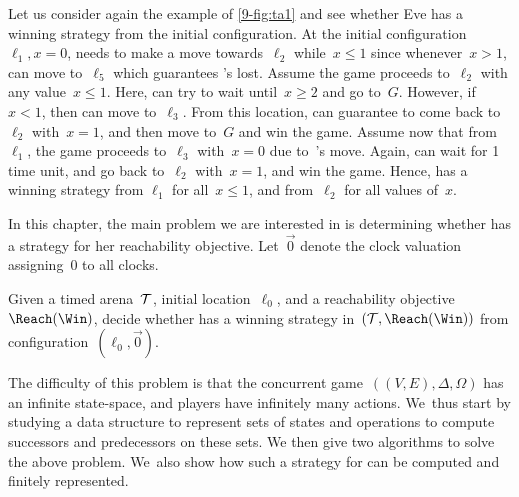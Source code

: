 \begin{example}
Let us consider again the example of \cref{9-fig:ta1} and see whether Eve
has a winning strategy from the initial configuration.
At the initial configuration~$\ell_1,x=0$, \Eve needs to make a move towards~$\ell_2$
while~$x\leq 1$ since whenever~$x>1$, \Adam can move to~$\ell_5$ which guarantees \Eve's lost.
Assume the game proceeds to~$\ell_2$ with any value~$x\leq 1$. Here, \Eve can try to wait
until~$x\geq 2$ and go to~$G$. However, if~$x<1$, then \Adam can move to~$\ell_3$.
From this location, \Eve can guarantee to come back to~$\ell_2$ with~$x=1$, and then move to~$G$ and win the game.
Assume now that from~$\ell_1$, the game proceeds to~$\ell_3$ with~$x=0$ due to~\Adam's move.
Again, \Eve can wait for 1 time unit, and go back to~$\ell_2$ with~$x=1$, and win the game.
%
Hence, \Eve has a winning strategy from $\ell_1$ for all~$x\leq 1$, and from~$\ell_2$
for all values of~$x$.
\end{example}


In this chapter, the main problem we are interested in is determining
whether \Eve has a strategy for her reachability objective.
Let~$\vec{0}$ denote the clock valuation assigning~$0$ to all clocks.

\begin{problem}
  Given a timed arena~$\mathcal T$, initial location~$\ell_0$, and a
  reachability objective~$\Reach(\Win)$,
  decide whether \Eve has a
  winning strategy in~$(\calT,\Reach(\Win))$ from
  configuration~$(\ell_0,\vec{0})$.
\end{problem}

The difficulty of this problem is that the concurrent
game~$((V,E),\Delta,\Omega)$ has an infinite state-space, and players
have infinitely many actions.  We~thus start by studying a data
structure to represent sets of states and operations to compute
successors and predecessors on these sets.  We then give two
algorithms to solve the above problem.  We~also show how such a
strategy for \Eve can be computed and finitely represented.
